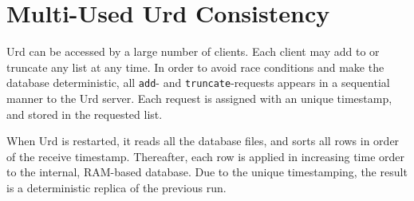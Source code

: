 \section{Multi-Used Urd Consistency}
Urd can be accessed by a large number of clients.  Each client may add
to or truncate any list at any time.  In order to avoid race
conditions and make the database deterministic, all \texttt{add}-
and \texttt{truncate}-requests appears in a sequential manner to the
Urd server.  Each request is assigned with an unique timestamp, and
stored in the requested list.

When Urd is restarted, it reads all the database files, and sorts all
rows in order of the receive timestamp.  Thereafter, each row is
applied in increasing time order to the internal, RAM-based database.
Due to the unique timestamping, the result is a deterministic replica
of the previous run.
